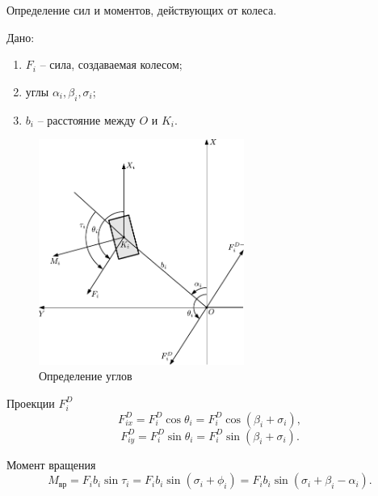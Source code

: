 \documentclass[a4paper,12pt]{article}
\begin{document}
\begin{lemma}
    Определение сил и моментов, действующих от колеса.

    Дано:
    \begin{enumerate}
        \item \(F_i\) -- сила, создаваемая колесом;
        \item углы \(\alpha_i, \beta_i, \sigma_i\);
        \item \(b_i\) -- расстояние между \(O\) и \(K_i\).
    \end{enumerate}

    \begin{figure}[H]
        \centering
        \includegraphics[width=0.6\textwidth]{lemma2.pdf}
        \caption{Определение углов}
        \label{fig:lemma2}
    \end{figure}

    Проекции \(F_i^D\)
    \[
        F_{i x}^D = F_i^D \cos \theta_i = F_i^D \cos\left( \beta_i + \sigma_i \right)
    ,\]
    \[
        F_{i y}^D = F_i^D \sin \theta_i = F_i^D \sin\left( \beta_i + \sigma_i \right)
    .\]

    Момент вращения
    \[
        M_\text{вр} = F_i b_i \sin \tau_i = F_i b_i \sin\left( \sigma_i + \phi_i \right) = F_i b_i \sin\left( \sigma_i + \beta_i - \alpha_i \right) 
    .\]
\end{lemma}
\end{document}
